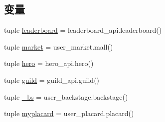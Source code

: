 \subsection*{变量}
\begin{DoxyCompactItemize}
\item 
tuple \hyperlink{namespaceapi_1_1backstage_a4095072443a2bf9b5457108550293f82}{leaderboard} = leaderboard\-\_\-api.\-leaderboard()
\item 
tuple \hyperlink{namespaceapi_1_1backstage_a8af69099b54eef7324ca8d9995b1fcf9}{market} = user\-\_\-market.\-mall()
\item 
tuple \hyperlink{namespaceapi_1_1backstage_a66ee1a73f79a363be7bdcdd33ef61dc1}{hero} = hero\-\_\-api.\-hero()
\item 
tuple \hyperlink{namespaceapi_1_1backstage_a0c7974dde6ecfec0df511eb7eeeb0780}{guild} = guild\-\_\-api.\-guild()
\item 
tuple \hyperlink{namespaceapi_1_1backstage_a0851633c94cfbf85f12206e68b4f766a}{\-\_\-bs} = user\-\_\-backstage.\-backstage()
\item 
tuple \hyperlink{namespaceapi_1_1backstage_ab00d3eb9e370dc065881b03b9fe34221}{myplacard} = user\-\_\-placard.\-placard()
\end{DoxyCompactItemize}


